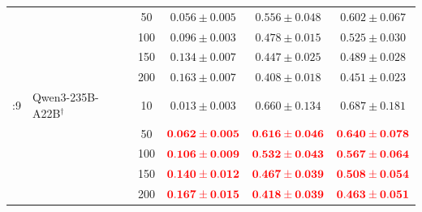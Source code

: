\documentclass[pdflatex,sn-mathphys-num]{sn-jnl}
\begin{document}
\begin{landscape}
\begin{longtable}{clcccc}
 &  & 50 & \(\mathbf{0.056 \pm 0.005}\) & \(\mathbf{0.556 \pm 0.048}\) & \(\mathbf{0.602 \pm 0.067}\) \\
 &  & 100 & \(0.096 \pm 0.003\) & \(0.478 \pm 0.015\) & \(\mathbf{0.525 \pm 0.030}\) \\
 &  & 150 & \(0.134 \pm 0.007\) & \(0.447 \pm 0.025\) & \(0.489 \pm 0.028\) \\
 &  & 200 & \(\mathbf{0.163 \pm 0.007}\) & \(\mathbf{0.408 \pm 0.018}\) & \(\mathbf{0.451 \pm 0.023}\) \\
\addlinespace[2pt]
1:9 & Qwen3-235B-A22B$^{\dagger}$ & 10 & \(0.013 \pm 0.003\) & \(0.660 \pm 0.134\) & \(0.687 \pm 0.181\) \\
 &  & 50 & \(\textcolor{red}{\mathbf{0.062 \pm 0.005}}\) & \(\textcolor{red}{\mathbf{0.616 \pm 0.046}}\) & \(\textcolor{red}{\mathbf{0.640 \pm 0.078}}\) \\
 &  & 100 & \(\textcolor{red}{\mathbf{0.106 \pm 0.009}}\) & \(\textcolor{red}{\mathbf{0.532 \pm 0.043}}\) & \(\textcolor{red}{\mathbf{0.567 \pm 0.064}}\) \\
 &  & 150 & \(\textcolor{red}{\mathbf{0.140 \pm 0.012}}\) & \(\textcolor{red}{\mathbf{0.467 \pm 0.039}}\) & \(\textcolor{red}{\mathbf{0.508 \pm 0.054}}\) \\
 &  & 200 & \(\textcolor{red}{\mathbf{0.167 \pm 0.015}}\) & \(\textcolor{red}{\mathbf{0.418 \pm 0.039}}\) & \(\textcolor{red}{\mathbf{0.463 \pm 0.051}}\) \\
\end{longtable}
\end{landscape}
\end{document}
